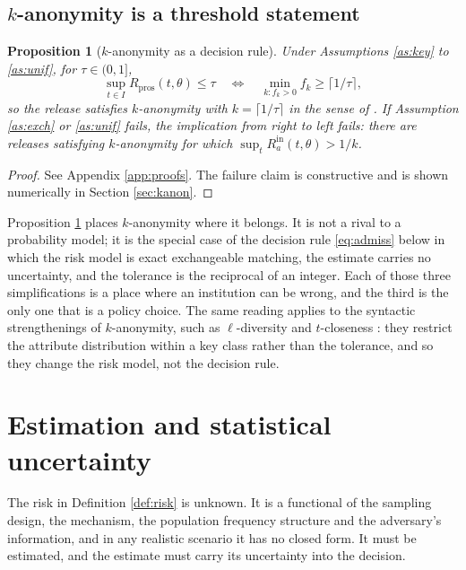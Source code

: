 \documentclass[11pt,a4paper]{article}
\theoremstyle{plain}
\newtheorem{proposition}{Proposition}
\theoremstyle{definition}
\begin{document}
\subsection{$k$-anonymity is a threshold statement}

\begin{proposition}[$k$-anonymity as a decision rule]\label{prop:kanon}
Under Assumptions \ref{as:key} to \ref{as:unif}, for $\tau \in (0,1]$,
\begin{equation}
\sup_{t \in I} R_{\mathrm{pros}}(t, \theta) \leq \tau
\quad \Longleftrightarrow \quad
\min_{k : f_k > 0} f_k \geq \lceil 1/\tau \rceil ,
\end{equation}
so the release satisfies $k$-anonymity with $k = \lceil 1/\tau \rceil$ in the
sense of \citet{sweeney2002}. If Assumption \ref{as:exch} or \ref{as:unif}
fails, the implication from right to left fails: there are releases satisfying
$k$-anonymity for which $\sup_t R_a^{\mathrm{in}}(t,\theta) > 1/k$.
\end{proposition}

\begin{proof}
See Appendix \ref{app:proofs}. The failure claim is constructive and is shown numerically in Section
\ref{sec:kanon}.
\end{proof}

Proposition \ref{prop:kanon} places $k$-anonymity where it belongs. It is not a
rival to a probability model; it is the special case of the decision rule
\eqref{eq:admiss} below in which the risk model is exact exchangeable matching,
the estimate carries no uncertainty, and the tolerance is the reciprocal of an
integer. Each of those three simplifications is a place where an institution
can be wrong, and the third is the only one that is a policy choice. The same
reading applies to the syntactic strengthenings of $k$-anonymity, such as
$\ell$-diversity \citep{machanavajjhala2007} and $t$-closeness
\citep{li2007}: they restrict the attribute distribution within a key class
rather than the tolerance, and so they change the risk model, not the decision
rule.

\section{Estimation and statistical uncertainty}\label{sec:est}

The risk in Definition \ref{def:risk} is unknown. It is a functional of the
sampling design, the mechanism, the population frequency structure and the
adversary's information, and in any realistic scenario it has no closed form.
It must be estimated, and the estimate must carry its uncertainty into the
decision.
\end{document}
